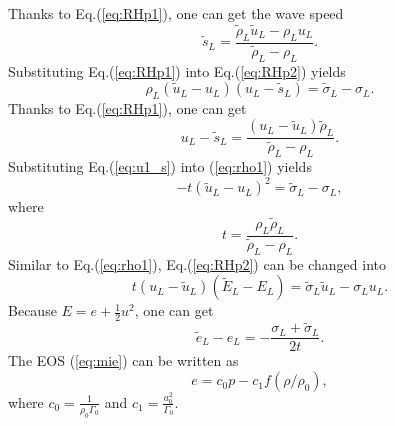 \documentclass[review]{elsarticle}
\begin{document}
 Thanks to Eq.(\ref{eq:RHp1}), one can get the wave speed
  \begin{equation}
    \widetilde{s}_L = \frac{\widetilde{\rho}_L \widetilde{u}_L-\rho_Lu_L}{\widetilde{\rho}_L-\rho_L}.
  \end{equation}
Substituting Eq.(\ref{eq:RHp1}) into Eq.(\ref{eq:RHp2}) yields
\begin{equation}\label{eq:rho1}
  \rho_L(\widetilde{u}_L - u_L)(u_L-\widetilde{s}_L) = \widetilde{\sigma}_L -\sigma_L.
\end{equation}
 Thanks to Eq.(\ref{eq:RHp1}), one can get
\begin{equation}\label{eq:u1_s}
  u_L-\widetilde{s}_L = \frac{(u_L-\widetilde{u}_L)\widetilde{\rho}_L}{\widetilde{\rho}_L-\rho_L}.
\end{equation}
Substituting Eq.(\ref{eq:u1_s}) into (\ref{eq:rho1}) yields
\begin{equation}\label{eq:tu_2}
  -t(\widetilde{u}_L-u_L)^2 = \widetilde{\sigma}_L-\sigma_L,
\end{equation}
where
\begin{equation}
t=\frac{\rho_L \widetilde{\rho}_L}{\widetilde{\rho}_L-\rho_L}.
\end{equation}
Similar to Eq.(\ref{eq:rho1}), Eq.(\ref{eq:RHp2}) can be changed into
\begin{equation}
  t(u_L-\widetilde{u}_L)(\widetilde{E}_L-E_L) =\widetilde{\sigma}_L\widetilde{u}_L-\sigma_Lu_L.
\end{equation}
Because $E = e+\frac{1}{2}u^2$, one can get
\begin{equation}\label{eq:e21}
  \widetilde{e}_L-e_L= -\frac{\sigma_L+\widetilde{\sigma}_L}{2t}.
\end{equation}
The EOS (\ref{eq:mie}) can be written as
\begin{equation} \label{eq:eos1}
  e=c_0 p-c_1f(\rho/\rho_0),
\end{equation}
where $c_0=\frac{1}{\rho_0\Gamma_0}$ and $c_1=\frac{a_0^2}{\Gamma_0}$.
\end{document}
